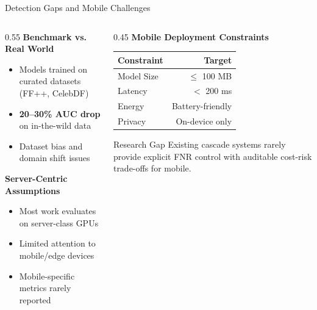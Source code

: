 \documentclass[aspectratio=169,12pt]{beamer}
\newcommand{\alerttext}[1]{\textcolor{alertred}{\textbf{#1}}}
\begin{document}
\begin{frame}{Detection Gaps and Mobile Challenges}
\begin{columns}[T]
\begin{column}{0.55\textwidth}
\textbf{Benchmark vs. Real World}
\begin{itemize}
\setlength\itemsep{0.1em}
    \item Models trained on curated datasets (FF++, CelebDF)
    \item \alerttext{20--30\% AUC drop} on in-the-wild data
    \item Dataset bias and domain shift issues
\end{itemize}

\vspace{0.3em}
\textbf{Server-Centric Assumptions}
\begin{itemize}
\setlength\itemsep{0.1em}
    \item Most work evaluates on server-class GPUs
    \item Limited attention to mobile/edge devices
    \item Mobile-specific metrics rarely reported
\end{itemize}
\end{column}

\begin{column}{0.45\textwidth}
\textbf{Mobile Deployment Constraints}
\begin{center}
\begin{tabular}{lr}
\toprule
\textbf{Constraint} & \textbf{Target} \\
\midrule
Model Size & $\leq$ 100 MB \\
Latency & $<$ 200 ms \\
Energy & Battery-friendly \\
Privacy & On-device only \\
\bottomrule
\end{tabular}
\end{center}

\vspace{0.5em}
\begin{block}{Research Gap}
Existing cascade systems rarely provide explicit FNR control with auditable cost-risk trade-offs for mobile.
\end{block}
\end{column}
\end{columns}
\end{frame}
\end{document}
